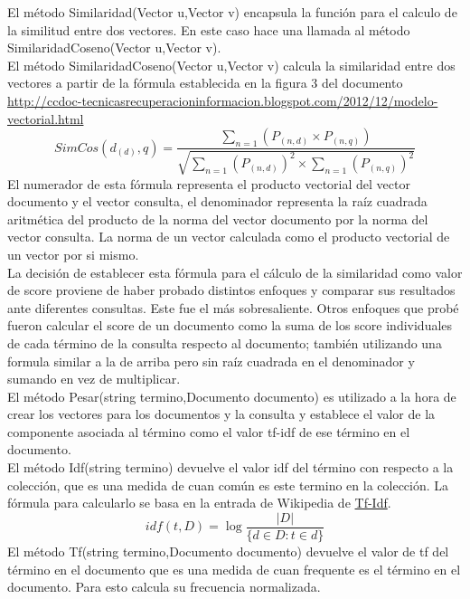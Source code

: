 \documentclass{article}
\begin{document}
El método Similaridad(Vector u,Vector v) encapsula la función para el calculo de la similitud entre dos vectores. En este caso hace una llamada al método SimilaridadCoseno(Vector u,Vector v).\\
El método SimilaridadCoseno(Vector u,Vector v) calcula la similaridad entre dos vectores a partir de la fórmula establecida en la figura 3 del documento \textcolor{blue}{\url{http://ccdoc-tecnicasrecuperacioninformacion.blogspot.com/2012/12/modelo-vectorial.html}}\\
\begin{equation}
  SimCos(d_{(d)},q) = \frac {\sum_{n=1} (P_{(n,d)} \times P_{(n,q)})}  {\sqrt{\sum_{n=1} (P_{(n,d)})^2 \times \sum_{n=1} (P_{(n,q)})^2}}
\end{equation}
El numerador de esta fórmula representa el producto vectorial del vector documento y el vector consulta, el denominador representa la raíz cuadrada aritmética del producto de la norma del vector documento por la norma del vector consulta. La norma de un vector calculada como el producto vectorial de un vector por si mismo.\\
La decisión de establecer esta fórmula para el cálculo de la similaridad como valor de score proviene de haber probado distintos enfoques y comparar sus resultados ante diferentes consultas. Este fue el más sobresaliente. Otros enfoques que probé fueron calcular el score de un documento como la suma de los score individuales de cada término de la consulta respecto al documento; también utilizando una formula similar a la de arriba pero sin raíz cuadrada en el denominador y sumando en vez de multiplicar.\\
El método Pesar(string termino,Documento documento) es utilizado a la hora de crear los vectores para los documentos y la consulta y establece el valor de la componente asociada al término como el valor tf-idf de ese término en el documento.\\
El método Idf(string termino) devuelve el valor idf del término con respecto a la colección, que es una medida de cuan común es este termino en la colección. La fórmula para calcularlo se basa en la entrada de Wikipedia de \textcolor{blue}{\href{https://es.wikipedia.org/wiki/Tf-idf}{Tf-Idf}}.\\
\begin{equation}
  idf(t,D) = \log{\frac{|D|}{\{d \in D : t \in d\}}}
\end{equation}
El método Tf(string termino,Documento documento) devuelve el valor de tf del término en el documento que es una medida de cuan frequente es el término en el documento. Para esto calcula su frecuencia normalizada.\\
\end{document}
